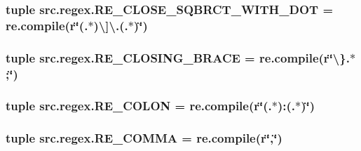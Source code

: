\hypertarget{namespacesrc_1_1regex_a733717dbc576a717f902b0fe9eb8fd15}{
\subsubsection[{R\-E\-\_\-\-C\-L\-O\-S\-E\-\_\-\-S\-Q\-B\-R\-C\-T\-\_\-\-W\-I\-T\-H\-\_\-\-D\-O\-T}]{\setlength{\rightskip}{0pt plus 5cm}tuple src.\-regex.\-R\-E\-\_\-\-C\-L\-O\-S\-E\-\_\-\-S\-Q\-B\-R\-C\-T\-\_\-\-W\-I\-T\-H\-\_\-\-D\-O\-T = re.\-compile(r\char`\"{}(.$\ast$)\textbackslash{}\mbox{]}\textbackslash{}.(.$\ast$)\char`\"{})}}\label{namespacesrc_1_1regex_a733717dbc576a717f902b0fe9eb8fd15}
\hypertarget{namespacesrc_1_1regex_af6fc08b34cd9ab90ca4f1dc0b82f8120}{
\subsubsection[{R\-E\-\_\-\-C\-L\-O\-S\-I\-N\-G\-\_\-\-B\-R\-A\-C\-E}]{\setlength{\rightskip}{0pt plus 5cm}tuple src.\-regex.\-R\-E\-\_\-\-C\-L\-O\-S\-I\-N\-G\-\_\-\-B\-R\-A\-C\-E = re.\-compile(r\char`\"{}\textbackslash{}\}.$\ast$;\char`\"{})}}\label{namespacesrc_1_1regex_af6fc08b34cd9ab90ca4f1dc0b82f8120}
\hypertarget{namespacesrc_1_1regex_a79ecaa21eb028d541077e037c02ca6e8}{
\subsubsection[{R\-E\-\_\-\-C\-O\-L\-O\-N}]{\setlength{\rightskip}{0pt plus 5cm}tuple src.\-regex.\-R\-E\-\_\-\-C\-O\-L\-O\-N = re.\-compile(r\char`\"{}(.$\ast$)\-:(.$\ast$)\char`\"{})}}\label{namespacesrc_1_1regex_a79ecaa21eb028d541077e037c02ca6e8}
\hypertarget{namespacesrc_1_1regex_ad704afcaad5c594908d369d49901768b}{
\subsubsection[{R\-E\-\_\-\-C\-O\-M\-M\-A}]{\setlength{\rightskip}{0pt plus 5cm}tuple src.\-regex.\-R\-E\-\_\-\-C\-O\-M\-M\-A = re.\-compile(r\char`\"{},\char`\"{})}}\label{namespacesrc_1_1regex_ad704afcaad5c594908d369d49901768b}
